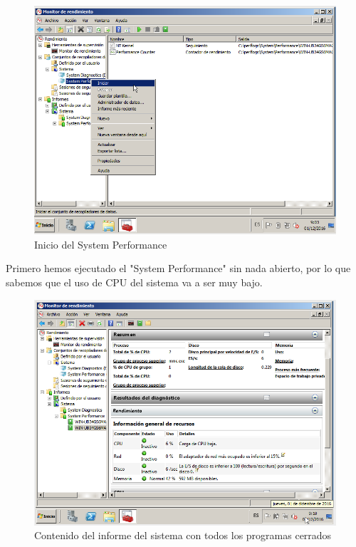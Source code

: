 \begin{figure}[H] %
	\centering
	\includegraphics[scale=0.5]{imagenes/iniciar-perfmon.png}  %
	\caption{Inicio del System Performance}
\end{figure}

Primero hemos ejecutado el "System Performance" sin nada abierto, por lo que sabemos que el uso de CPU del sistema va a ser muy bajo.

\begin{figure}[H] %
	\centering
	\includegraphics[scale=0.5]{imagenes/prog-cerrados.png}  %
	\caption{Contenido del informe del sistema con todos los programas cerrados}
\end{figure}

